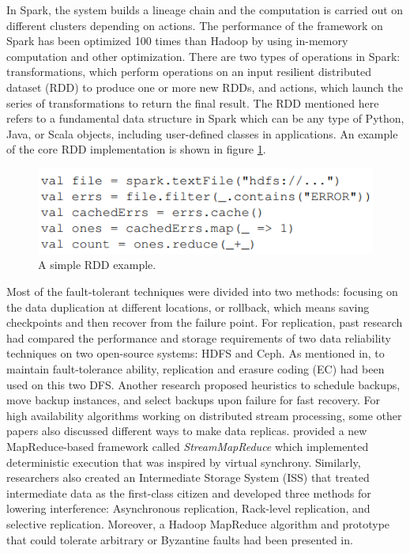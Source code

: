 \documentclass[11pt,twocolumn]{article}
\begin{document}
In Spark, the system builds a lineage chain and the computation is carried out on different clusters depending on actions. The performance of the framework on Spark has been optimized 100 times than Hadoop by using in-memory computation and other optimization. There are two types of operations in Spark: transformations, which perform operations on an input resilient distributed dataset (RDD) to produce one or more new RDDs, and actions, which launch the series of transformations to return the final result. The RDD mentioned here refers to a fundamental data structure in Spark which can be any type of Python, Java, or Scala objects, including user-defined classes in applications\cite{zaharia2012resilient}. An example of the core RDD implementation is shown in figure \ref{fig:example}.
\begin{figure}[ht]
    \centering
        \includegraphics[width=\linewidth]{example}
        \caption{A simple RDD example\cite{zaharia2010spark}.}
        \label{fig:example}
\end{figure}

Most of the fault-tolerant techniques were divided into two methods: focusing on the data duplication at different locations, or rollback, which means saving checkpoints and then recover from the failure point\cite{bala2012fault,patil2013hadoop}. For replication, past research had compared the performance and storage requirements of two data reliability techniques on two open-source systems: HDFS\cite{borthakur2007hadoop} and Ceph. As mentioned in\cite{Arafa:2018:EFT:3219104.3229269}, to maintain fault-tolerance ability, replication and erasure coding (EC) had been used on this two DFS. Another research proposed heuristics to schedule backups, move backup instances, and select backups upon failure for fast recovery\cite{5470865}. For high availability algorithms working on distributed stream processing\cite{hwang2005high,hwang2007cooperative,neumeyer2010s4}, some other papers also discussed different ways to make data replicas\cite{vora2011hadoop}. \cite{5961745} provided a new MapReduce-based framework called \textit{StreamMapReduce} which implemented deterministic execution that was inspired by virtual synchrony. Similarly, researchers also created an Intermediate Storage System (ISS) that treated intermediate data as the first-class citizen and developed three methods for lowering interference: Asynchronous replication, Rack-level replication, and selective replication\cite{Ko:2010:MCI:1807128.1807160}. Moreover, a Hadoop MapReduce algorithm and prototype that could tolerate arbitrary or Byzantine faults\cite{lamport1982byzantine} had been presented in\cite{6133124}.\par
\end{document}

